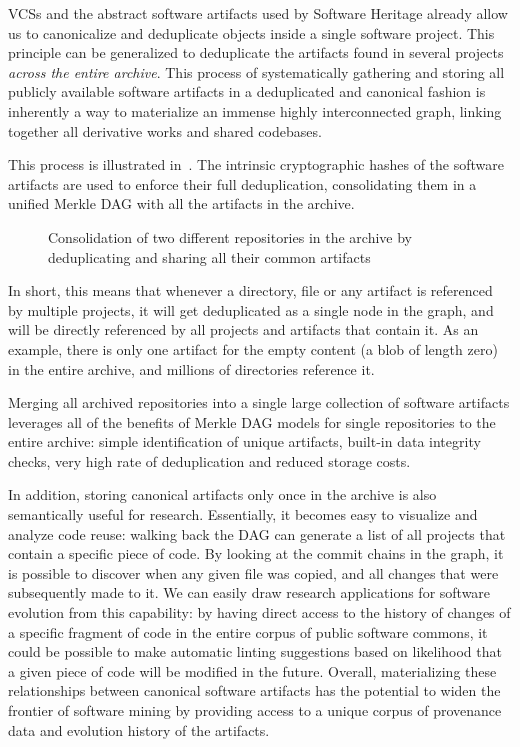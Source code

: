 \glspl{VCS} and the abstract software artifacts used by Software Heritage
already allow us to canonicalize and deduplicate objects inside a single
software project. This principle can be generalized to deduplicate the
artifacts found in several projects \emph{across the entire archive}.
This process of systematically gathering and storing all publicly available
software artifacts in a deduplicated and canonical fashion is inherently a way
to materialize an immense highly interconnected graph, linking together all
derivative works and shared codebases.

This process is illustrated in~. The
intrinsic cryptographic hashes of the software artifacts are used to enforce
their full deduplication, consolidating them in a unified Merkle \gls{DAG} with
all the artifacts in the archive.

\begin{figure}
    \centering
    
    \caption{Consolidation of two different repositories in the archive by
    deduplicating and sharing all their common artifacts}%
    \label{fig:consolidating-archive}
\end{figure}

In short, this means that whenever a directory, file or any artifact is
referenced by multiple projects, it will get deduplicated as a single node in
the graph, and will be directly referenced by all projects and artifacts
that contain it. As an example, there is only one artifact for the empty
content (a blob of length zero) in the entire archive, and millions of
directories reference it.

Merging all archived repositories into a single large collection of software
artifacts leverages all of the benefits of Merkle \gls{DAG} models for single
repositories to the entire archive: simple identification of unique artifacts,
built-in data integrity checks, very high rate of deduplication and reduced
storage costs.

In addition, storing canonical artifacts only once in the archive is also
semantically useful for research. Essentially, it becomes easy to visualize
and analyze code reuse: walking back the \gls{DAG} can generate a list of all
projects that contain a specific piece of code. By looking at the commit
chains in the graph, it is possible to discover when any given file was copied,
and all changes that were subsequently made to it.
We can easily draw research applications for software evolution from this
capability: by having direct access to the history of changes of a specific
fragment of code in the entire corpus of public software commons, it could be
possible to make automatic linting suggestions based on likelihood that a given
piece of code will be modified in the future. Overall, materializing these
relationships between canonical software artifacts has the potential to widen
the frontier of software mining by providing access to a unique corpus of
provenance data and evolution history of the artifacts.


